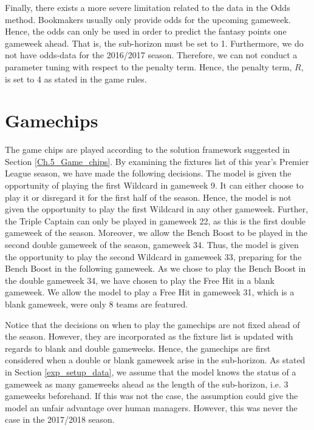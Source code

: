 \newpar

Finally, there exists a more severe limitation related to the data in the Odds method. Bookmakers usually only provide odds for the upcoming gameweek. Hence, the odds can only be used in order to predict the fantasy points one gameweek ahead. That is, the sub-horizon must be set to 1. Furthermore, we do not have odds-data for the 2016/2017 season. Therefore, we can not conduct a parameter tuning with respect to the penalty term. Hence, the penalty term, $R$, is set to 4 as stated in the game rules. 

\newpar



\section{Gamechips} \label{exp_setup_gamechips}

The game chips are played according to the solution framework suggested in Section \ref{Ch.5_Game_chips}. By examining the fixtures list of this year's Premier League season, we have made the following decisions. The model is given the opportunity of playing the first Wildcard in gameweek 9. It can either choose to play it or disregard it for the first half of the season. Hence, the model is not given the opportunity to play the first Wildcard in any other gameweek. Further, the Triple Captain can only be played in gameweek 22, as this is the first double gameweek of the season. Moreover, we allow the Bench Boost to be played in the second double gameweek of the season, gameweek 34. Thus, the model is given the opportunity to play the second Wildcard in gameweek 33, preparing for the Bench Boost in the following gameweek. As we chose to play the Bench Boost in the double gameweek 34, we have chosen to play the Free Hit in a blank gameweek. We allow the model to play a Free Hit in gameweek 31, which is a blank gameweek, were only 8 teams are featured. 

\newpar

Notice that the decisions on when to play the gamechips are not fixed ahead of the season. However, they are incorporated as the fixture list is updated with regards to blank and double gameweeks. Hence, the gamechips are first considered when a double or blank gameweek arise in the sub-horizon. As stated in Section \ref{exp_setup_data}, we assume that the model knows the status of a gameweek as many gameweeks ahead as the length of the sub-horizon, i.e. 3 gameweeks beforehand. If this was not the case, the assumption could give the model an unfair advantage over human managers. However, this was never the case in the 2017/2018 season.


